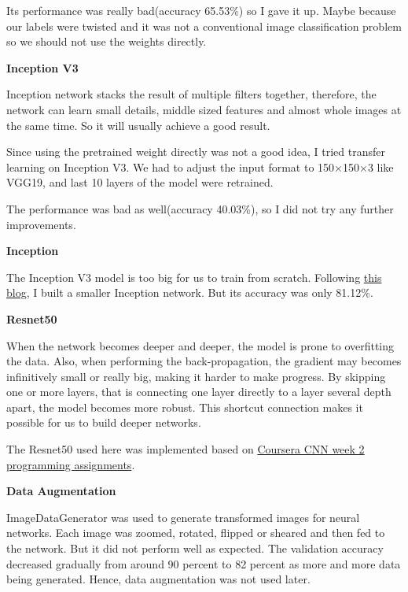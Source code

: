 \documentclass[12pt]{article}
\begin{document}
Its performance was really bad(accuracy 65.53\%) so I gave it up. Maybe because our labels were twisted and it was not a conventional image classification problem so we should not use the weights directly. 

\textbf{Inception V3}

Inception network stacks the result of multiple filters together, therefore, the network can learn small details, middle sized features and almost whole images at the same time. So it will usually achieve a good result.

Since using the pretrained weight directly was not a good idea, I tried transfer learning on Inception V3. We had to adjust the input format to 150$\times$150$\times$3 like VGG19, and last 10 layers of the model were retrained. 

The performance was bad as well(accuracy 40.03\%), so I did not try any further improvements.

\textbf{Inception}

The Inception V3 model is too big for us to train from scratch. Following \href{https://machinelearningmastery.com/how-to-implement-major-architecture-innovations-for-convolutional-neural-networks/}{this blog}, I built a smaller Inception network. But its accuracy was only 81.12\%. 

\textbf{Resnet50}

When the network becomes deeper and deeper, the model is prone to overfitting the data. Also, when performing the back-propagation, the gradient may becomes infinitively small or really big, making it harder to make progress. By skipping one or more layers, that is connecting one layer directly to a layer several depth apart, the model becomes more robust. This shortcut connection makes it possible for us to build deeper networks.

The Resnet50 used here was implemented based on \href{https://www.coursera.org/learn/convolutional-neural-networks?specialization=deep-learning#syllabus}{Coursera CNN week 2 programming assignments}.

\textbf{Data Augmentation}

ImageDataGenerator was used to generate transformed images for neural networks. Each image was zoomed, rotated, flipped or sheared and then fed to the network. But it did not perform well as expected. The validation accuracy decreased gradually from around 90 percent to 82 percent as more and more data being generated. Hence, data augmentation was not used later.\\
\end{document}
